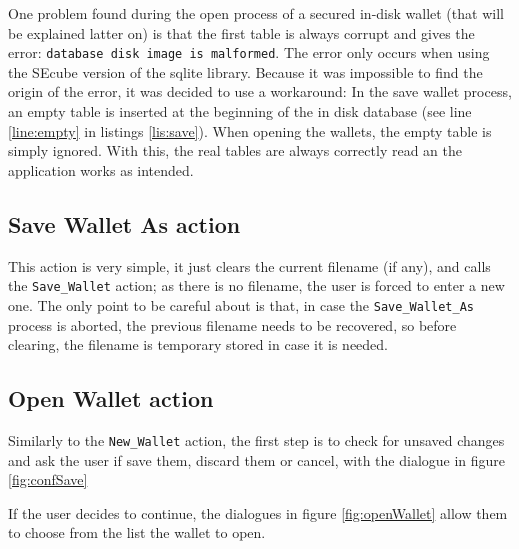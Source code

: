 One problem found during the open process of a secured in-disk wallet (that will be explained latter on) is that the first table is always corrupt and gives the error: \texttt{database disk image is malformed}. The error only occurs when using the SEcube version of the sqlite library. Because it was impossible to find the origin of the error, it was decided to use a workaround: In the save wallet process, an empty table is inserted at the beginning of the in disk database (see line \ref{line:empty} in listings \ref{lis:save}). When opening the wallets, the empty table is simply ignored. With this, the real tables are always correctly read an the application works as intended.


\subsection{Save Wallet As action}

This action is very simple, it just clears the current filename (if any), and calls the \texttt{Save\_Wallet} action; as there is no filename, the user is forced to enter a new one. The only point to be careful about is that, in case the \texttt{Save\_Wallet\_As} process is aborted, the previous filename needs to be recovered, so before clearing, the filename is temporary stored in case it is needed.

\subsection{Open Wallet action}
Similarly to the \texttt{New\_Wallet} action, the first step is to check for unsaved changes and ask the user if save them, discard them or cancel, with the dialogue in figure \ref{fig:confSave}

If the user decides to continue, the dialogues in figure \ref{fig:openWallet} allow them to choose from the list the wallet to open.

